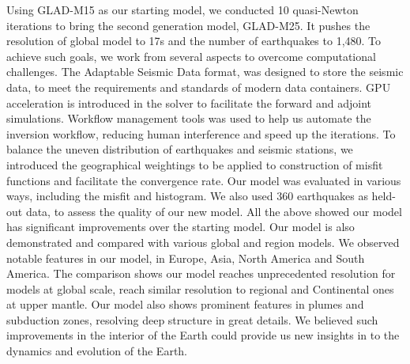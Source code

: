 Using GLAD-M15 as our starting model, we conducted 10 quasi-Newton iterations to bring
the second generation model, GLAD-M25. It pushes the resolution of global model to 17s
and the number of earthquakes to 1,480. To achieve such goals, we work from several
aspects to overcome computational challenges. The Adaptable Seismic Data format,
was designed to store the seismic data, to meet the requirements and standards
of modern data containers. GPU acceleration is introduced in the solver to facilitate
the forward and adjoint simulations. Workflow management tools was used to help
us automate the inversion workflow, reducing human interference and speed up the
iterations. To balance the uneven distribution of earthquakes and seismic stations,
we introduced the geographical weightings to be applied to construction of misfit
functions and facilitate the convergence rate. Our model was evaluated in various
ways, including the misfit and histogram. We also used 360 earthquakes as held-out
data, to assess the quality of our new model. All the above showed our model has
significant improvements over the starting model. Our model is also demonstrated
and compared with various global and region models. We observed notable features
in our model, in Europe, Asia, North America and South America. The comparison
shows our model reaches unprecedented resolution for models at global scale, reach
similar resolution to regional and Continental ones at upper mantle. Our model also
shows prominent features in plumes and subduction zones, resolving deep structure
in great details. We believed such improvements in the interior of the Earth could 
provide us new insights in to the dynamics and evolution of the Earth.

